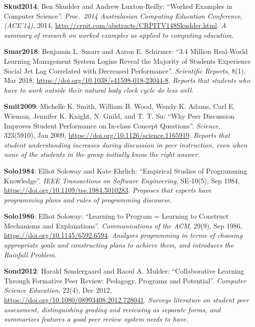 \textbf{\hypertarget{b:Skud2014}{Skud2014}\label{b:Skud2014}}: Ben Skudder and Andrew Luxton-Reilly: ``Worked Examples in Computer Science''. \emph{Proc.\ 2014 Australasian Computing Education Conference, (ACE'14)}, 2014, \url{http://crpit.com/abstracts/CRPITV148Skudder.html}. \emph{A summary of research on worked examples as applied to computing education.}

\textbf{\hypertarget{b:Smar2018}{Smar2018}\label{b:Smar2018}}: Benjamin L. Smarr and Aaron E. Schirmer: ``3.4 Million Real-World Learning Management System Logins Reveal the Majority of Students Experience Social Jet Lag Correlated with Decreased Performance''. \emph{Scientific Reports}, 8(1), Mar 2018, \url{https://doi.org/10.1038/s41598-018-23044-8}. \emph{Reports that students who have to work outside their natural body clock cycle do less well.}

\textbf{\hypertarget{b:Smit2009}{Smit2009}\label{b:Smit2009}}: Michelle K. Smith, William B. Wood, Wendy K. Adams, Carl E. Wieman, Jennifer K. Knight, N. Guild, and T. T. Su: ``Why Peer Discussion Improves Student Performance on In-class Concept Questions''. \emph{Science}, 323(5910), Jan 2009, \url{https://doi.org/10.1126/science.1165919}. \emph{Reports that student understanding increases during discussion in peer instruction, even when none of the students in the group initially know the right answer.}

\textbf{\hypertarget{b:Solo1984}{Solo1984}\label{b:Solo1984}}: Elliot Soloway and Kate Ehrlich: ``Empirical Studies of Programming Knowledge''. \emph{IEEE Transactions on Software Engineering}, SE-10(5), Sep 1984, \url{https://doi.org/10.1109/tse.1984.5010283}. \emph{Proposes that experts have programming plans and rules of programming discourse.}

\textbf{\hypertarget{b:Solo1986}{Solo1986}\label{b:Solo1986}}: Elliot Soloway: ``Learning to Program = Learning to Construct Mechanisms and Explanations''. \emph{Communications of the ACM}, 29(9), Sep 1986, \url{https://doi.org/10.1145/6592.6594}. \emph{Analyzes programming in terms of choosing appropriate goals and constructing plans to achieve them, and introduces the Rainfall Problem.}

\textbf{\hypertarget{b:Sond2012}{Sond2012}\label{b:Sond2012}}: Harald Søndergaard and Raoul A. Mulder: ``Collaborative Learning Through Formative Peer Review: Pedagogy, Programs and Potential''. \emph{Computer Science Education}, 22(4), Dec 2012, \url{https://doi.org/10.1080/08993408.2012.728041}. \emph{Surveys literature on student peer assessment, distinguishing grading and reviewing as separate forms, and summarizes features a good peer review system needs to have.}

